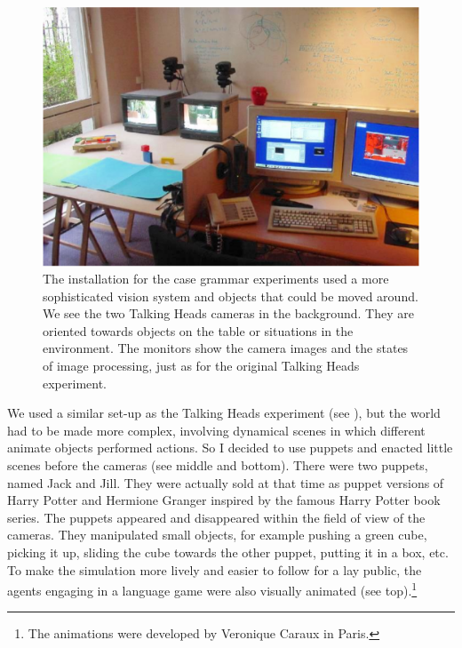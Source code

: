 \begin{figure}[htbp]
  \centerline{\includegraphics[width=.60\textwidth]{chap10/figs/PERACT-setup.pdf}}
\caption{\label{fig:PERACT-setup}The installation for the case grammar experiments used a more sophisticated vision system and objects that 
could be moved around. We see the two Talking Heads cameras in 
the background. They are oriented towards objects on the table or situations in the 
environment. The monitors show the camera images and the states of image processing, just as for the original 
Talking Heads experiment. 
}
\end{figure}

We used a similar set-up as the Talking Heads experiment (see ), but 
the world had to be made more complex, involving dynamical scenes in which 
different animate objects performed actions. So I decided to use 
puppets and enacted little scenes before the cameras (see  middle and bottom). 
There were two puppets, named Jack and Jill. They were actually sold at that time as puppet versions of Harry 
Potter and Hermione Granger inspired by the famous Harry Potter book series. 
The puppets appeared and disappeared within the field of view of the cameras. 
They manipulated small objects, for example pushing a green cube, picking it up, sliding the cube
towards the other puppet, putting it in a box, etc. To make the simulation more lively and easier to follow for 
a lay public, the agents engaging in a language game were also visually animated (see 
 top).\footnote{The animations were developed by Veronique Caraux in Paris.}


